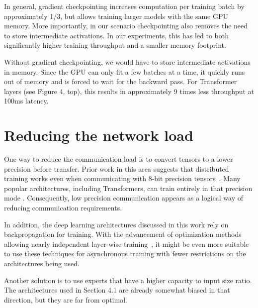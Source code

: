 In general, gradient checkpointing increases computation per training batch by approximately 1/3, but allows training larger models with the same GPU memory. More importantly, in our scenario checkpointing also removes the need to store intermediate activations. In our experiments, this has led to both significantly higher training throughput and a smaller memory footprint.

Without gradient checkpointing, we would have to store intermediate activations in memory. Since the GPU can only fit a few batches at a time, it quickly runs out of memory and is forced to wait for the backward pass. For Transformer layers (see Figure 4, top), this results in approximately 9 times less throughput at 100ms latency.

\vspace{-4pt}
\section{Reducing the network load}\label{appendix:networkload}
\vspace{-4pt}

One way to reduce the communication load is to convert tensors to a lower precision before transfer. Prior work in this area suggests that distributed training works even when communicating with 8-bit precision tensors~\cite{Dettmers20158BitAF, natural_compression}. Many popular architectures, including Transformers, can train entirely in that precision mode \cite{NIPS2019_8736}. Consequently, low precision communication appears as a logical way of reducing communication requirements.

In addition, the deep learning architectures discussed in this work rely on backpropagation for training. With the advancement of optimization methods allowing nearly independent layer-wise training~\cite{ma2019hsic,jaderberg2017decoupled,real2017large}, it might be even more suitable to use these techniques for asynchronous training with fewer restrictions on the architectures being used.

Another solution is to use experts that have a higher capacity to input size ratio. The architectures used in Section 4.1 are already somewhat biased in that direction, but they are far from optimal.